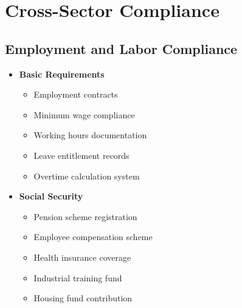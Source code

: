 \vspace{2em}


\section{Cross-Sector Compliance}\label{sec:cross-sector-compliance}
\vspace{1em}

\subsection{Employment and Labor Compliance}\label{subsec:employment-compliance}
\vspace{1em}

\begin{tcolorbox}[
    colback=white,
    colframe=primarydark,
    title=\textbf{Labor Law Requirements},
    before skip=1em,
    after skip=1em
]
    \begin{itemize}[leftmargin=*,itemsep=0.5em]
        \item \textbf{Basic Requirements}
        \begin{itemize}[itemsep=0.3em]
            \item Employment contracts
            \item Minimum wage compliance
            \item Working hours documentation
            \item Leave entitlement records
            \item Overtime calculation system
        \end{itemize}

        \vspace{0.5em}

        \item \textbf{Social Security}
        \begin{itemize}[itemsep=0.3em]
            \item Pension scheme registration
            \item Employee compensation scheme
            \item Health insurance coverage
            \item Industrial training fund
            \item Housing fund contribution
        \end{itemize}

        \vspace{0.5em}


\end{itemize}
\end{tcolorbox}
